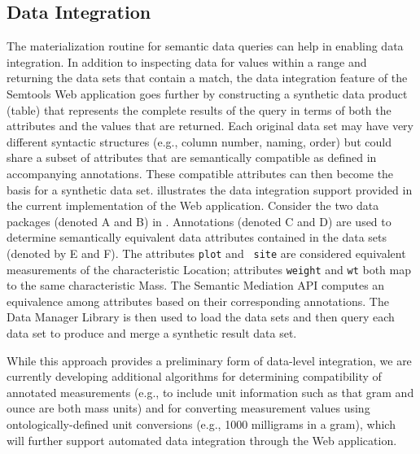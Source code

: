 \subsection{Data Integration} 

The materialization routine for semantic data queries can help in
enabling data integration. In addition to inspecting data for values
within a range and returning the data sets that contain a match, the
data integration feature of the Semtools Web application goes further
by constructing a synthetic data product (table) that represents the
complete results of the query in terms of both the attributes and the
values that are returned. Each original data set may have very
different syntactic structures (e.g., column number, naming, order)
but could share a subset of attributes that are semantically
compatible as defined in accompanying annotations. These compatible
attributes can then become the basis for a synthetic data set.
 illustrates the data integration support
provided in the current implementation of the Web
application. Consider the two data packages (denoted A and B) in
.  Annotations (denoted C and D) are used to
determine semantically equivalent data attributes contained in the
data sets (denoted by E and F). The attributes {\tt plot} and {\tt
  site} are considered equivalent measurements of the characteristic
Location; attributes {\tt weight} and {\tt wt} both map to the same
characteristic Mass. The Semantic Mediation API computes an
equivalence among attributes based on their corresponding
annotations. The Data Manager Library is then used to load the data
sets and then query each data set to produce and merge a synthetic
result data set.

While this approach provides a preliminary form of data-level
integration, we are currently developing additional algorithms for
determining compatibility of annotated measurements (e.g., to include
unit information such as that gram and ounce are both mass units) and
for converting measurement values using ontologically-defined unit
conversions (e.g., 1000 milligrams in a gram), which will further
support automated data integration through the Web application.


